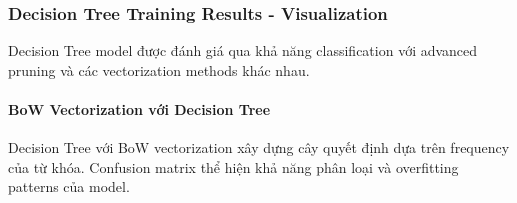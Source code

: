 \subsubsection{Decision Tree Training Results - Visualization}

Decision Tree model được đánh giá qua khả năng classification với advanced pruning và các vectorization methods khác nhau.

\paragraph{BoW Vectorization với Decision Tree}

Decision Tree với BoW vectorization xây dựng cây quyết định dựa trên frequency của từ khóa. Confusion matrix thể hiện khả năng phân loại và overfitting patterns của model.

